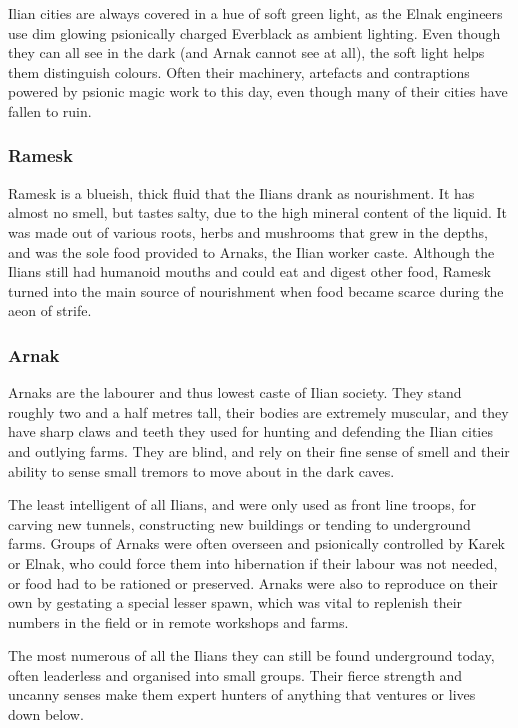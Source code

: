 Ilian cities are always covered in a hue of soft green light, as the Elnak
engineers use dim glowing psionically charged Everblack as ambient
lighting. Even though they can all see in the dark (and Arnak cannot see at
all), the soft light helps them distinguish colours. Often their machinery,
artefacts and contraptions powered by psionic magic work to this day, even
though many of their cities have fallen to ruin.

\subsubsection{Ramesk}
\label{sec:Ramesk}

Ramesk is a blueish, thick fluid that the Ilians drank as nourishment. It has
almost no smell, but tastes salty, due to the high mineral content of the
liquid. It was made out of various roots, herbs and mushrooms that grew in the
depths, and was the sole food provided to Arnaks, the Ilian worker caste.
Although the Ilians still had humanoid mouths and could eat and digest other
food, Ramesk turned into the main source of nourishment when food became scarce
during the aeon of strife.

\subsubsection{Arnak}
\label{sec:Arnak}

Arnaks are the labourer and thus lowest caste of Ilian society. They stand
roughly two and a half metres tall, their bodies are extremely muscular, and
they have sharp claws and teeth they used for hunting and defending the Ilian
cities and outlying farms. They are blind, and rely on their fine sense of
smell and their ability to sense small tremors to move about in the dark caves.

The least intelligent of all Ilians, and were only used as front line troops,
for carving new tunnels, constructing new buildings or tending to underground
farms. Groups of Arnaks were often overseen and psionically controlled by
Karek or Elnak, who could force them into hibernation if their labour was not
needed, or food had to be rationed or preserved. Arnaks were also to reproduce
on their own by gestating a special lesser spawn, which was vital to replenish
their numbers in the field or in remote workshops and farms.

The most numerous of all the Ilians they can still be found underground today,
often leaderless and organised into small groups. Their fierce strength and
uncanny senses make them expert hunters of anything that ventures or lives down
below.


